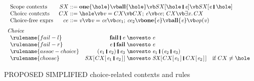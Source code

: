 \documentclass[acmsmall,review,dvipsnames,nocopyrightspace]{acmart}
\newcommand{\Conid}[1]{\mathit{#1}}
\newcommand{\Varid}[1]{\mathit{#1}}
\begin{document}
\begin{figure}
  $$
  \begin{array}{l}
    \begin{array}{lr@{\;}c@{\;}l}
    \text{Scope contexts} & SX & ::= & \ensuremath{\textbf{one}\{\hole\}} \vb \ensuremath{\textbf{all}\{\hole\}} \vb SX[ \ensuremath{\hole\;\rule[-0.3mm]{0.5mm}{2.5mm}\;\Varid{e}} ] \vb SX[ \ensuremath{\Varid{e}\;\rule[-0.3mm]{0.5mm}{2.5mm}\;\hole} ]\\
    \text{Choice contexts} & CX & ::= & \hole \vb \ensuremath{\Varid{v}=CX} \vb \ensuremath{CX;\,\Varid{e}} \vb \ensuremath{\Varid{ce};\,CX} \vb \ensuremath{\exists\Varid{x}.\,CX} \\
    \text{Choice-free exprs} & ce  & ::=  & \ensuremath{\Varid{v}} \vb \ensuremath{\Varid{v}=\Varid{ce}} \vb \ensuremath{\Varid{ce}_{\mathrm{1}};\,\Varid{ce}_{\mathrm{2}}}
    \vb \ensuremath{\textbf{one}\{\Varid{e}\}} \vb \ensuremath{\textbf{all}\{\Varid{e}\}}
    \vb \ensuremath{\Varid{op}(\Varid{v})}
   \end{array} \\

  \\[-2mm]

    \textit{Choice} \\
    \begin{array}{lr@{\;}c@{\;}ll}
    \rulename{fail-l} & \ensuremath{\textbf{fail}\;\rule[-0.3mm]{0.5mm}{2.5mm}\;\Varid{e}} & \movesto & \ensuremath{\Varid{e}} \\
    \rulename{fail-r} & \ensuremath{\Varid{e}\;\rule[-0.3mm]{0.5mm}{2.5mm}\;\textbf{fail}} & \movesto & \ensuremath{\Varid{e}} \\
    \rulename{assoc-choice} & \ensuremath{(\Varid{e}_{\mathrm{1}}\;\rule[-0.3mm]{0.5mm}{2.5mm}\;\Varid{e}_{\mathrm{2}})\;\rule[-0.3mm]{0.5mm}{2.5mm}\;\Varid{e}_{\mathrm{3}}} & \movesto & \ensuremath{\Varid{e}_{\mathrm{1}}\;\rule[-0.3mm]{0.5mm}{2.5mm}\;(\Varid{e}_{\mathrm{2}}\;\rule[-0.3mm]{0.5mm}{2.5mm}\;\Varid{e}_{\mathrm{3}})} \\
    \rulename{choose} & \ensuremath{\Conid{SX} [\mskip1.5mu CX [\mskip1.5mu \Varid{e}_{\mathrm{1}}\;\rule[-0.3mm]{0.5mm}{2.5mm}\;\Varid{e}_{\mathrm{2}}\mskip1.5mu]\mskip1.5mu]} & \movesto & \ensuremath{\Conid{SX} [\mskip1.5mu CX [\mskip1.5mu \Varid{e}_{\mathrm{1}}\mskip1.5mu]\;\rule[-0.3mm]{0.5mm}{2.5mm}\;CX [\mskip1.5mu \Varid{e}_{\mathrm{2}}\mskip1.5mu]\mskip1.5mu]} & \text{if}~\ensuremath{CX} \ne \hole
    \end{array} \\
   \end{array}
   $$
  \caption{PROPOSED SIMPLIFIED choice-related contexts and rules}
\end{figure}
\end{document}
